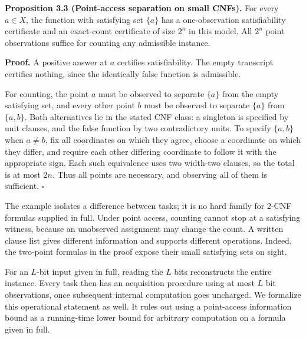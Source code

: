 \documentclass[11pt,letterpaper]{article}
\newenvironment{manualstatement}{%
  \par\addvspace{0.7\baselineskip}\begingroup\itshape\noindent\ignorespaces
}{\par\endgroup\addvspace{0.4\baselineskip}}
\newenvironment{manualproof}{%
  \par\addvspace{0.4\baselineskip}\begingroup\normalfont\noindent\ignorespaces
}{\par\endgroup\addvspace{0.5\baselineskip}}
\begin{document}
\begin{manualstatement}

{{\upshape \textbf{Proposition 3.3 (Point-access separation on small
CNFs).}}} For every \(a\in X\), the function with satisfying set
\(\{a\}\) has a one-observation satisfiability certificate and an
exact-count certificate of size \(2^n\) in this model. All \(2^n\) point
observations suffice for counting any admissible instance.

\end{manualstatement}

\begin{manualproof}

\textbf{Proof.} A positive answer at \(a\) certifies satisfiability. The
empty transcript certifies nothing, since the identically false function
is admissible.

For counting, the point \(a\) must be observed to separate \(\{a\}\)
from the empty satisfying set, and every other point \(b\) must be
observed to separate \(\{a\}\) from \(\{a,b\}\). Both alternatives lie
in the stated CNF class: a singleton is specified by unit clauses, and
the false function by two contradictory units. To specify \(\{a,b\}\)
when \(a\ne b\), fix all coordinates on which they agree, choose a
coordinate on which they differ, and require each other differing
coordinate to follow it with the appropriate sign. Each such equivalence
uses two width-two clauses, so the total is at most \(2n\). Thus all
points are necessary, and observing all of them is sufficient.
\(\square\)

\end{manualproof}

The example isolates a difference between tasks; it is no hard family
for 2-CNF formulas supplied in full. Under point access, counting cannot
stop at a satisfying witness, because an unobserved assignment may
change the count. A written clause list gives different information and
supports different operations. Indeed, the two-point formulas in the
proof expose their small satisfying sets on sight.

For an \(L\)-bit input given in full, reading the \(L\) bits
reconstructs the entire instance. Every task then has an acquisition
procedure using at most \(L\) bit observations, once subsequent internal
computation goes uncharged. We formalize this operational statement as
well. It rules out using a point-access information bound as a
running-time lower bound for arbitrary computation on a formula given in
full.
\end{document}
